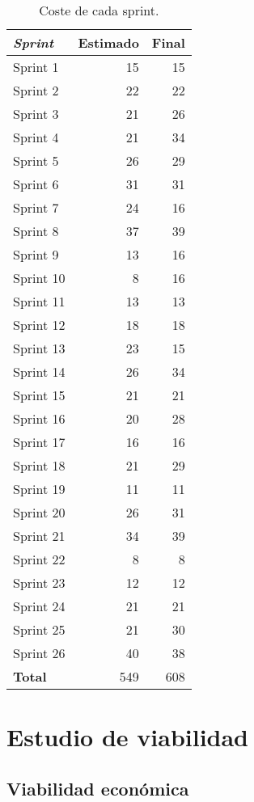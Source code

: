 \begin{table}[H]
	\begin{tabularx}{\textwidth}{Xrr}
		\toprule \textbf{\textit{Sprint}} & \textbf{Estimado} & \textbf{Final}\\
		\toprule
		Sprint 1 & 15 & 15 \\
		Sprint 2 & 22 & 22 \\
		Sprint 3 & 21 & 26 \\
		Sprint 4 & 21 & 34 \\
		Sprint 5 & 26 & 29 \\
		Sprint 6 & 31 & 31 \\
		Sprint 7 & 24 & 16 \\
		Sprint 8 & 37 & 39 \\
		Sprint 9 & 13 & 16 \\
		Sprint 10 & 8 & 16 \\
		Sprint 11 & 13 & 13 \\
		Sprint 12 & 18 & 18 \\
		Sprint 13 & 23 & 15 \\
		Sprint 14 & 26 & 34 \\
		Sprint 15 & 21 & 21 \\
		Sprint 16 & 20 & 28 \\
		Sprint 17 & 16 & 16 \\
		Sprint 18 & 21 & 29 \\
		Sprint 19 & 11 & 11 \\
		Sprint 20 & 26 & 31 \\
		Sprint 21 & 34 & 39 \\
		Sprint 22 & 8 & 8 \\
		Sprint 23 & 12 & 12 \\
		Sprint 24 & 21 & 21 \\
		Sprint 25 & 21 & 30 \\
		Sprint 26 & 40 & 38 \\
		\midrule
		\textbf{Total} & 549 & 608 \\
		\bottomrule
	\end{tabularx}
	\caption{Coste de cada sprint.}
	\label{tab:costes_sprints}
\end{table}

\section{Estudio de viabilidad}

\subsection{Viabilidad económica}

